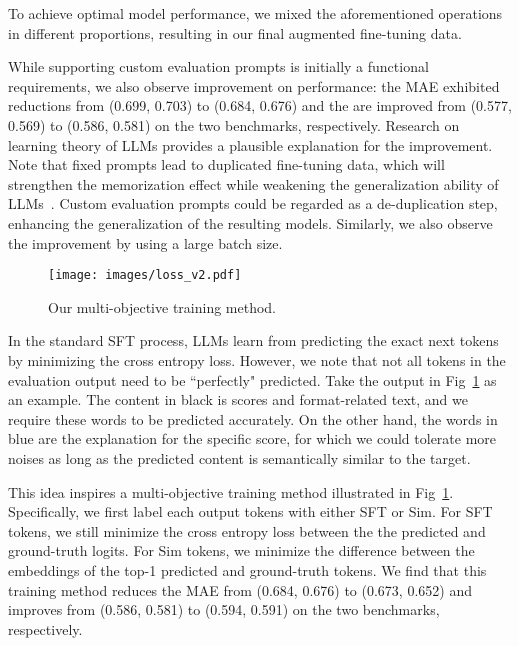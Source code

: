To achieve optimal model performance, we mixed the aforementioned operations in different proportions, resulting in our final augmented fine-tuning data.


While supporting custom evaluation prompts is initially a functional requirements, we also observe improvement on performance: the MAE exhibited reductions from (0.699, 0.703) to (0.684, 0.676) and the  are improved from (0.577, 0.569) to (0.586, 0.581)
on the two benchmarks, respectively. Research on learning theory of LLMs provides a plausible explanation for the improvement. Note that fixed prompts lead to duplicated fine-tuning data, which will strengthen the memorization effect while weakening the generalization ability of LLMs~\cite{llm-acquire-know}. Custom evaluation prompts could be regarded as a de-duplication step, enhancing the generalization of the resulting models.
Similarly, we also observe the improvement by using a large batch size. 


\begin{figure}[t]
    \centering
    \texttt{[image: images/loss\_v2.pdf]}
    \caption{Our multi-objective training method.}
    \label{fig:loss}
\end{figure}


In the standard SFT process, LLMs learn from predicting the exact next tokens by minimizing the cross entropy loss.
However, we note that not all tokens in the evaluation output need to be ``perfectly" predicted. 
Take the output in Fig~\ref{fig:loss} as an example. The content in black is scores and format-related text, and  we require these words to be predicted accurately. On the other hand, the words in blue are the explanation for the specific score, for which we could tolerate more noises as long as the predicted content is semantically similar to the target.


This idea inspires a multi-objective training method illustrated in Fig~\ref{fig:loss}. Specifically, we first label each output tokens with either SFT or Sim. For SFT tokens, we still minimize the cross entropy loss between the the predicted and ground-truth logits. For Sim tokens, we minimize the difference between the embeddings of the top-1 predicted and ground-truth tokens. We find that this training method reduces the 
MAE from (0.684, 0.676) to (0.673, 0.652) and improves  from (0.586, 0.581) to (0.594, 0.591)
on the two benchmarks, respectively.



